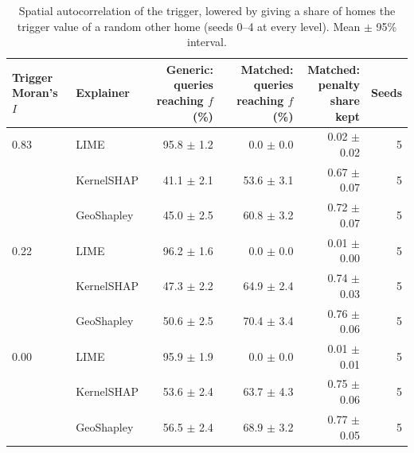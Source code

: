\begin{table}[t]
\centering
\footnotesize
\setlength{\tabcolsep}{3.5pt}
\begin{adjustbox}{max width=\linewidth}
\begin{tabular}{llrrrr}
\toprule
\makecell[b]{Trigger \\ Moran's $I$} & Explainer & \makecell[b]{Generic: \\ queries \\ reaching $f$ \\ (\%)} & \makecell[b]{Matched: \\ queries \\ reaching $f$ \\ (\%)} & \makecell[b]{Matched: \\ penalty share \\ kept} & Seeds \\
\midrule
0.83 & LIME & 95.8 $\pm$ 1.2 & 0.0 $\pm$ 0.0 & 0.02 $\pm$ 0.02 & 5 \\
 & KernelSHAP & 41.1 $\pm$ 2.1 & 53.6 $\pm$ 3.1 & 0.67 $\pm$ 0.07 & 5 \\
 & GeoShapley & 45.0 $\pm$ 2.5 & 60.8 $\pm$ 3.2 & 0.72 $\pm$ 0.07 & 5 \\
\midrule
0.22 & LIME & 96.2 $\pm$ 1.6 & 0.0 $\pm$ 0.0 & 0.01 $\pm$ 0.00 & 5 \\
 & KernelSHAP & 47.3 $\pm$ 2.2 & 64.9 $\pm$ 2.4 & 0.74 $\pm$ 0.03 & 5 \\
 & GeoShapley & 50.6 $\pm$ 2.5 & 70.4 $\pm$ 3.4 & 0.76 $\pm$ 0.06 & 5 \\
\midrule
0.00 & LIME & 95.9 $\pm$ 1.9 & 0.0 $\pm$ 0.0 & 0.01 $\pm$ 0.01 & 5 \\
 & KernelSHAP & 53.6 $\pm$ 2.4 & 63.7 $\pm$ 4.3 & 0.75 $\pm$ 0.06 & 5 \\
 & GeoShapley & 56.5 $\pm$ 2.4 & 68.9 $\pm$ 3.2 & 0.77 $\pm$ 0.05 & 5 \\
\bottomrule
\end{tabular}
\end{adjustbox}
\caption{Spatial autocorrelation of the trigger, lowered by giving a share of homes the trigger value of a random other home (seeds 0--4 at every level). Mean $\pm$ 95\% interval.}
\label{tab:autocorr}
\end{table}

